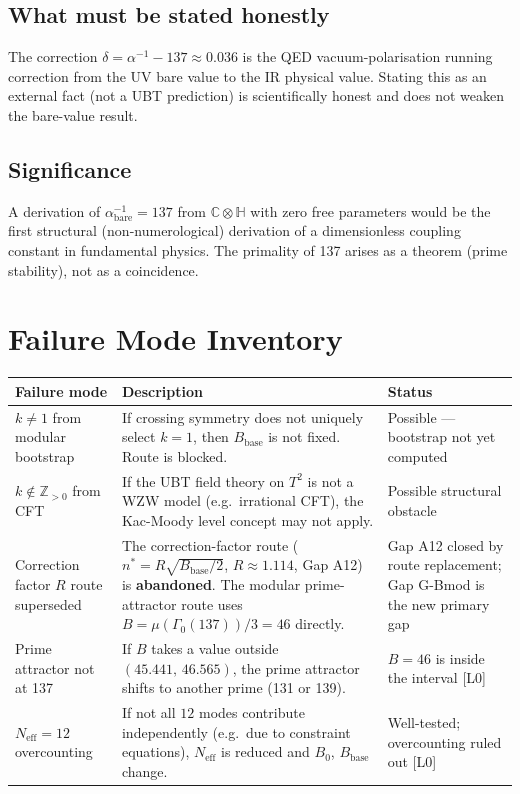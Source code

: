 \documentclass[12pt,a4paper]{article}
\theoremstyle{definition}
\theoremstyle{remark}
\begin{document}
\subsection{What must be stated honestly}

The correction $\delta = \alpha^{-1} - 137 \approx 0.036$ is the QED
vacuum-polarisation running correction from the UV bare value to the IR physical
value.  Stating this as an external fact (not a UBT prediction) is scientifically
honest and does not weaken the bare-value result.

\subsection{Significance}

A derivation of $\alpha^{-1}_{\mathrm{bare}} = 137$ from $\mathbb{C}\otimes\mathbb{H}$
with zero free parameters would be the first structural (non-numerological) derivation
of a dimensionless coupling constant in fundamental physics.  The primality of 137
arises as a theorem (prime stability), not as a coincidence.

\section{Failure Mode Inventory}
\label{sec:bc:failures}

\begin{longtable}{p{4cm} p{6cm} p{3.5cm}}
\toprule
\textbf{Failure mode} & \textbf{Description} & \textbf{Status} \\
\midrule
$k \neq 1$ from modular bootstrap &
  If crossing symmetry does not uniquely select $k=1$, then $B_{\mathrm{base}}$
  is not fixed.  Route is blocked. &
  Possible — bootstrap not yet computed \\
\midrule
$k \notin \mathbb{Z}_{>0}$ from CFT &
  If the UBT field theory on $T^2$ is not a WZW model (e.g.\ irrational CFT),
  the Kac-Moody level concept may not apply. &
  Possible structural obstacle \\
\midrule
Correction factor $R$ route superseded &
  The correction-factor route ($n^* = R\sqrt{B_{\mathrm{base}}/2}$,
  $R \approx 1.114$, Gap A12) is \textbf{abandoned}.  The modular
  prime-attractor route uses $B = \mu(\Gamma_0(137))/3 = 46$ directly. &
  Gap A12 closed by route replacement; Gap G-Bmod is the new primary gap \\
\midrule
Prime attractor not at 137 &
  If $B$ takes a value outside $(45.441,\,46.565)$, the prime attractor
  shifts to another prime (131 or 139). &
  $B = 46$ is inside the interval [L0] \\
\midrule
$N_{\mathrm{eff}} = 12$ overcounting &
  If not all $12$ modes contribute independently (e.g.\ due to constraint equations),
  $N_{\mathrm{eff}}$ is reduced and $B_0$, $B_{\mathrm{base}}$ change. &
  Well-tested; overcounting ruled out [L0] \\
\bottomrule
\end{longtable}
\end{document}

